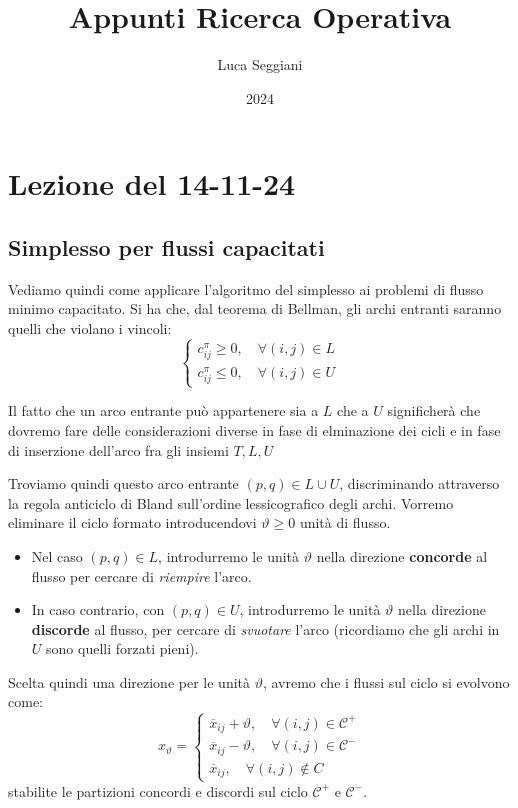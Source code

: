 \documentclass[a4paper,11pt]{article}
\title{Appunti Ricerca Operativa}
\author{Luca Seggiani}
\date{2024}
\begin{document}
\section{Lezione del 14-11-24}

\thispagestyle{empty}
\pagestyle{fancy}

\subsection{Simplesso per flussi capacitati}
Vediamo quindi come applicare l'algoritmo del simplesso ai problemi di flusso minimo capacitato.
Si ha che, dal teorema di Bellman, gli archi entranti saranno quelli che violano i vincoli:
\[
	\begin{cases}
		c_{ij}^\pi \geq 0, \quad \forall (i, j) \in L \\ 
		c_{ij}^\pi \leq 0, \quad \forall (i, j) \in U
	\end{cases}
\]

Il fatto che un arco entrante può appartenere sia a $L$ che a $U$ significherà che dovremo fare delle considerazioni diverse in fase  di elminazione dei cicli e in fase di inserzione dell'arco fra gli insiemi $T, L, U$ 

Troviamo quindi questo arco entrante $(p, q) \in L \cup U$, discriminando attraverso la regola anticiclo di Bland sull'ordine lessicografico degli archi. 
Vorremo eliminare il ciclo formato introducendovi $\vartheta \geq 0$ unità di flusso.

\begin{itemize}
	\item 
Nel caso $(p,q) \in L$, introdurremo le unità $\vartheta$ nella direzione \textbf{concorde} al flusso per cercare di \textit{riempire} l'arco.
	\item 
In caso contrario, con $(p,q) \in U$, introdurremo le unità $\vartheta$ nella direzione \textbf{discorde} al flusso, per cercare di \textit{svuotare} l'arco (ricordiamo che gli archi in $U$ sono quelli forzati pieni).
\end{itemize}

Scelta quindi una direzione per le unità $\vartheta$, avremo che i flussi sul ciclo si evolvono come:
$$
x_\vartheta =
	\begin{cases}
		\overline{x}_{ij} + \vartheta, \quad \forall (i, j) \in \mathcal{C}^+ \\ 
		\overline{x}_{ij} - \vartheta, \quad \forall (i, j) \in \mathcal{C}^- \\
		\overline{x}_{ij}, \quad \forall (i, j) \notin C
	\end{cases}
$$
stabilite le partizioni concordi e discordi sul ciclo $\mathcal{C}^+$ e $\mathcal{C}^-$.
\end{document}
